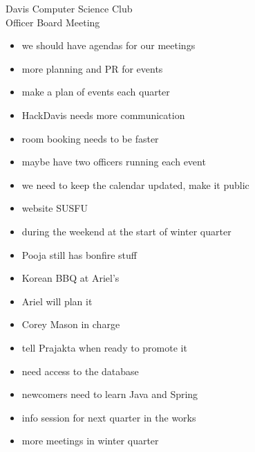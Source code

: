 \documentclass{article}
\begin{document}
\begin{Minutes}{Davis Computer Science Club\\Officer Board Meeting}
\missingNoExcuse{}




\maketitle
{}
\begin{itemize}
\item we should have agendas for our meetings
\item more planning and PR for events
\item make a plan of events each quarter
\item HackDavis needs more communication
\item room booking needs to be faster
\item maybe have two officers running each event
\item we need to keep the calendar updated, make it public
\item website SUSFU
\end{itemize}

\begin{itemize}
\item during the weekend at the start of winter quarter
\item Pooja still has bonfire stuff
\item Korean BBQ at Ariel's
\item Ariel will plan it
\end{itemize}

\begin{itemize}
\item Corey Mason in charge
\item tell Prajakta when ready to promote it
\end{itemize}

\begin{itemize}
\item need access to the database
\item newcomers need to learn Java and Spring
\item info session for next quarter in the works
\item more meetings in winter quarter
\end{itemize}


\end{Minutes}
\end{document}
